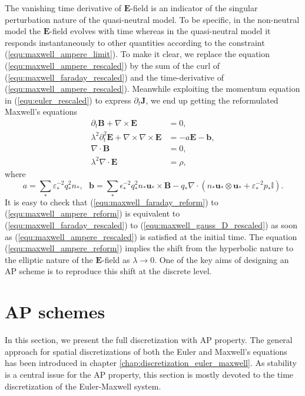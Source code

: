 \documentclass{report}
\begin{document}
The vanishing time derivative of $\mathbf{E}$-field is an indicator of the singular perturbation nature of the quasi-neutral model. To be specific, in the non-neutral model the $\mathbf{E}$-field evolves with time whereas in the quasi-neutral model it responds instantaneously to other quantities according to the constraint (\ref{equ:maxwell_ampere_limit}). To make it clear, we replace the equation (\ref{equ:maxwell_ampere_rescaled}) by the sum of the curl of (\ref{equ:maxwell_faraday_rescaled}) and the time-derivative of (\ref{equ:maxwell_ampere_rescaled}). Meanwhile exploiting the momentum equation in (\ref{equ:euler_rescaled}) to express $\partial_t\mathbf{J}$, we end up getting the reformulated Maxwell's equations
\begin{align}
    \partial_t \mathbf{B} + \nabla \times \mathbf{E} &= 0, \label{equ:maxwell_faraday_reform}\\
    \lambda^2\partial_t^2 \mathbf{E} + \nabla \times \nabla \times \mathbf{E} &= - a\mathbf{E} - \mathbf{b}, \label{equ:maxwell_ampere_reform}\\
    \nabla \cdot \mathbf{B} &= 0,  \label{equ:maxwell_gauss_B_reform}\\
    \lambda^2\nabla \cdot \mathbf{E} &= \rho, \label{equ:maxwell_gauss_D_reform}
\end{align}
where
\begin{equation*}
    a = \sum_*\varepsilon_*^{-2}q_*^2n_*, \ \ \ \mathbf{b} = \sum_* \epsilon_*^{-2}q_*^2n_*\mathbf{u}_*\times\mathbf{B} - q_*\nabla\cdot(n_* \mathbf{u}_* \otimes \mathbf{u}_* + \varepsilon_*^{-2}p_*\mathbb{I}).
\end{equation*}
It is easy to check that (\ref{equ:maxwell_faraday_reform}) to (\ref{equ:maxwell_ampere_reform}) is equivalent to (\ref{equ:maxwell_faraday_rescaled}) to (\ref{equ:maxwell_gauss_D_rescaled}) as soon as (\ref{equ:maxwell_ampere_rescaled}) is satisfied at the initial time. The equation (\ref{equ:maxwell_ampere_reform}) implies the shift from the hyperbolic nature to the elliptic nature of the $\mathbf{E}$-field as $\lambda\rightarrow0$. One of the key aims of designing an AP scheme is to reproduce this shift at the discrete level.

\section{AP schemes}
In this section, we present the full discretization with AP property. The general approach for spatial discretizations of both the Euler and Maxwell's equations has been introduced in chapter \ref{chap:discretization_euler_maxwell}. As stability is a central issue for the AP property, this section is mostly devoted to the time discretization of the Euler-Maxwell system.
\end{document}
